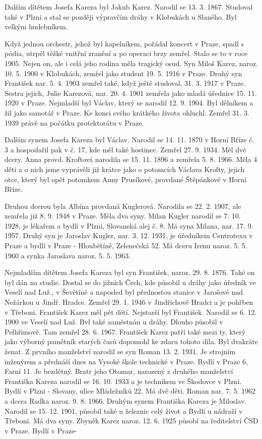 \documentclass[../dejiny-rodu-prusiku.tex]{subfiles}
\begin{document}
Dalším dítětem Josefa Kareza byl Jakub Karez. Narodil se 13. 3. 1867. Studoval také v Plzni a stal se později výprav­čím dráhy v Klobukách u Slaného. Byl velkým hudebníkem.

Když jednou orchestr, jehož byl kapelníkem, pořádal koncert v Praze, spadl s pódia, utrpěl těžké vnitřní zranění a po operaci brzy zemřel. Stalo se to v roce 1905. Nejen on, ale i celá jeho rodina měla tragický osud. Syn Miloš Karez, naroz. 10. 5. 1900 v Klobukách, zemřel jako student 19. 5. 1916 v Praze. Druhý syn František nar. 5. 4. 1903 zemřel také, když ještě studoval, 31. 3. 1917 v Praze. Sestra jejich, Julie Karezová, nar. 20. 4. 1901 zemřela jako mladá úřednice 15. 11. 1920 v Praze. Nejmladší byl Václav, který se narodil 12. 9. 1904. Byl dělníkem a žil jako samotář v Praze. Ke konci své­ho krátkého života ohluchl. Zemřel 31. 3. 1939 právě na počátku protektorátu v Praze.

Dalším synem Josefa Kareza byl Václav. Narodil se 14. 11. 1870 v Horní Bříze č. 3 a hospodařil pak v č. 17, kde měl také hostinec. Zemřel 27. 9. 1934. Měl dvě dcery. Anna provd. Kroftová narodila se 15. 11. 1896 a zemřela 5. 8. 1966. Měla 4 děti a o nich jsme vyprávěli již krátce jako o potomcích Václava Krofty, jejich otce, který byl opět potomkem Anny Prusíkové, provdané Štěpánkové v Horní Bříze.

Druhou dcerou byla Albína provdaná Kuglerová. Naro­dila se 22. 2. 1907, ale zemřela již 8.  9. 1948 v Praze. Měla dva syny. Milan Kugler narodil se 7. 10. 1928, je lékařem a bydlí v Plzni, Slovanská alej č. 8. Má syna Milana, nar. 17. 9. 1957. Druhý syn je Jaroslav Kugler, nar. 3. 12. 1931, je úředníkem Centrotexu v Praze a bydlí v Praze - Hloubětíně, Zelenečská 52. Má dceru Irenu naroz. 5. 5. 1960 a synka Jaroslava naroz. 5. 5. 1963.

Nejmladším dítětem Josefa Kareza byl syn František, naroz. 29. 8. 1876. Také on byl dán na studie. Dostal se do jižních Čech, kde působil u dráhy jako úředník ve Veselí nad Luž., v Ševětíně a naposled byl před­nostou stanice v Jarošové nad Nežárkou u Jindř. Hradce. Zemřel 29. 1. 1946 v Jindřichově Hradci a je pohřben v Třeboni. František Karez měl pět dětí. Nejstarší byl František. Narodil se 6. 12. 1900 ve Veselí nad Luž. Bvl také zaměstnán u dráhy. Dlouho působil v Pelhřimově. Tam zemřel 28. 6. 1967. František Karez patří také mezi ty, který jako výborný pamětník starých časů dopomohl ke zdaru tohoto díla. Byl dvakráte ženat. Z prvního manželství narodil se syn Roman 13. 2. 1931. Je strojním inženýrem a přednáší dnes na Vysoké škole technické v Praze. Bydlí v Praze 6, Farní 11. Je bezdětný. Bratr jeho Otomar, narozený z druhého manželství Františka Kareza narodil se 16. 10. 1933 a je technikem ve Škodovce v Plzni. Bydlí v Plzni - Slovany, ulice Mládežníků 22. Má dvě děti. Roman nar. 7. 5. 1962 a dcera Radka naroz. 9. 8. 1966.
Druhým synem Františka Kareza je Miloslav. Narodil se 15. 12. 1901, působil také u železnic celý život a Bydlí u nádraží v Třeboni. Má dva syny. Zbyněk Karez naroz. 12. 6. 1925 působí na ředitelství ČSD v Praze. Bydlí v Praze-
\end{document}
